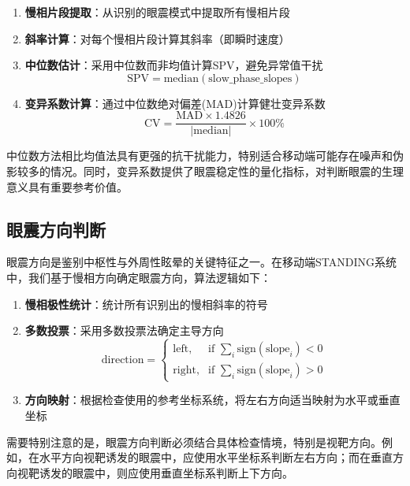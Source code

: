 \begin{enumerate}
  \item \textbf{慢相片段提取}：从识别的眼震模式中提取所有慢相片段
  \item \textbf{斜率计算}：对每个慢相片段计算其斜率（即瞬时速度）
  \item \textbf{中位数估计}：采用中位数而非均值计算SPV，避免异常值干扰
   \begin{equation}
   \text{SPV} = \text{median}(\text{slow\_phase\_slopes})
   \end{equation}
  \item \textbf{变异系数计算}：通过中位数绝对偏差(MAD)计算健壮变异系数
   \begin{equation}
   \text{CV} = \frac{\text{MAD} \times 1.4826}{|\text{median}|} \times 100\%
   \end{equation}
\end{enumerate}

中位数方法相比均值法具有更强的抗干扰能力，特别适合移动端可能存在噪声和伪影较多的情况。同时，变异系数提供了眼震稳定性的量化指标，对判断眼震的生理意义具有重要参考价值。

\subsection{眼震方向判断}

眼震方向是鉴别中枢性与外周性眩晕的关键特征之一。在移动端STANDING系统中，我们基于慢相方向确定眼震方向，算法逻辑如下：

\begin{enumerate}
  \item \textbf{慢相极性统计}：统计所有识别出的慢相斜率的符号
  \item \textbf{多数投票}：采用多数投票法确定主导方向
   \begin{equation}
   \text{direction} = \begin{cases}
   \text{left}, & \text{if } \sum_{i} \text{sign}(\text{slope}_i) < 0 \\
   \text{right}, & \text{if } \sum_{i} \text{sign}(\text{slope}_i) > 0
   \end{cases}
   \end{equation}
  \item \textbf{方向映射}：根据检查使用的参考坐标系统，将左右方向适当映射为水平或垂直坐标
\end{enumerate}

需要特别注意的是，眼震方向判断必须结合具体检查情境，特别是视靶方向。例如，在水平方向视靶诱发的眼震中，应使用水平坐标系判断左右方向；而在垂直方向视靶诱发的眼震中，则应使用垂直坐标系判断上下方向。

